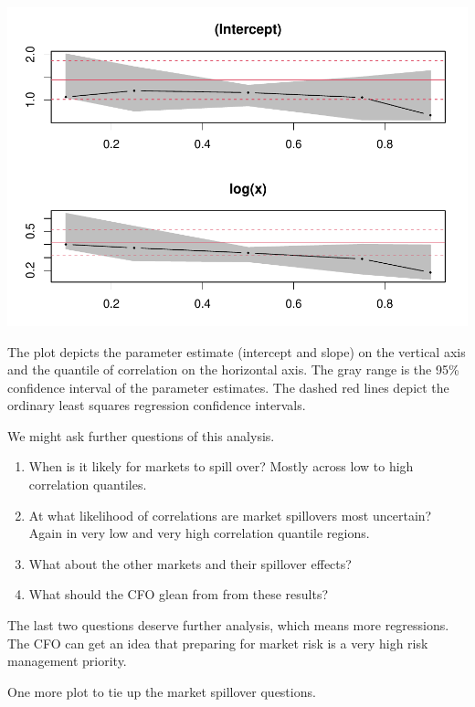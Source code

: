 \documentclass{article}
\begin{document}
\includegraphics{market-facts_files/figure-latex/quantile-1.pdf}

The plot depicts the parameter estimate (intercept and slope) on the
vertical axis and the quantile of correlation on the horizontal axis.
The gray range is the 95\% confidence interval of the parameter
estimates. The dashed red lines depict the ordinary least squares
regression confidence intervals.

We might ask further questions of this analysis.

\begin{enumerate}
\def\labelenumi{\arabic{enumi}.}
\item
  When is it likely for markets to spill over? Mostly across low to high
  correlation quantiles.
\item
  At what likelihood of correlations are market spillovers most
  uncertain? Again in very low and very high correlation quantile
  regions.
\item
  What about the other markets and their spillover effects?
\item
  What should the CFO glean from from these results?
\end{enumerate}

The last two questions deserve further analysis, which means more
regressions. The CFO can get an idea that preparing for market risk is a
very high risk management priority.

One more plot to tie up the market spillover questions.
\end{document}
